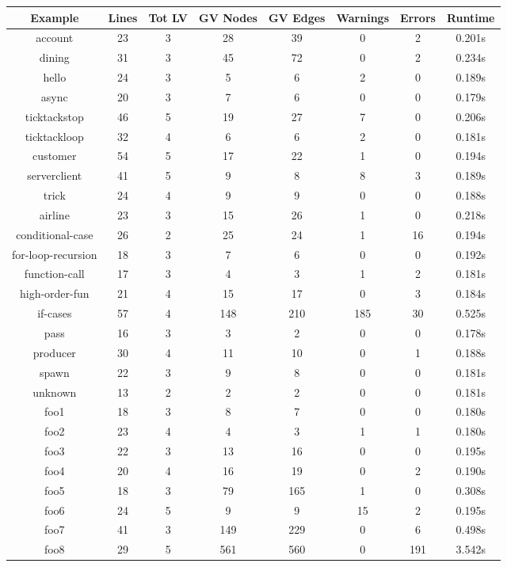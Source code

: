 \begin{table}[!ht]
\centering
\begin{tabular}{|c|c|c|c|c|c|c|c|}
\hline
Example & Lines & Tot LV & GV Nodes & GV Edges & Warnings & Errors & Runtime \\ 
\hline
account & 23 & 3 & 28 & 39 & 0 & 2 & 0.201s \\ 
dining & 31 & 3 & 45 & 72 & 0 & 2 & 0.234s \\ 
hello & 24 & 3 & 5 & 6 & 2 & 0 & 0.189s \\ 
async & 20 & 3 & 7 & 6 & 0 & 0 & 0.179s \\ 
ticktackstop & 46 & 5 & 19 & 27 & 7 & 0 & 0.206s \\ 
ticktackloop & 32 & 4 & 6 & 6 & 2 & 0 & 0.181s \\ 
customer & 54 & 5 & 17 & 22 & 1 & 0 & 0.194s \\ 
serverclient & 41 & 5 & 9 & 8 & 8 & 3 & 0.189s \\ 
trick & 24 & 4 & 9 & 9 & 0 & 0 & 0.188s \\ 
airline & 23 & 3 & 15 & 26 & 1 & 0 & 0.218s \\ 
conditional-case & 26 & 2 & 25 & 24 & 1 & 16 & 0.194s \\ 
for-loop-recursion & 18 & 3 & 7 & 6 & 0 & 0 & 0.192s \\ 
function-call & 17 & 3 & 4 & 3 & 1 & 2 & 0.181s \\ 
high-order-fun & 21 & 4 & 15 & 17 & 0 & 3 & 0.184s \\ 
if-cases & 57 & 4 & 148 & 210 & 185 & 30 & 0.525s \\ 
pass & 16 & 3 & 3 & 2 & 0 & 0 & 0.178s \\ 
producer & 30 & 4 & 11 & 10 & 0 & 1 & 0.188s \\ 
spawn & 22 & 3 & 9 & 8 & 0 & 0 & 0.181s \\ 
unknown & 13 & 2 & 2 & 2 & 0 & 0 & 0.181s \\ 
foo1 & 18 & 3 & 8 & 7 & 0 & 0 & 0.180s \\ 
foo2 & 23 & 4 & 4 & 3 & 1 & 1 & 0.180s \\ 
foo3 & 22 & 3 & 13 & 16 & 0 & 0 & 0.195s \\ 
foo4 & 20 & 4 & 16 & 19 & 0 & 2 & 0.190s \\ 
foo5 & 18 & 3 & 79 & 165 & 1 & 0 & 0.308s \\ 
foo6 & 24 & 5 & 9 & 9 & 15 & 2 & 0.195s \\ 
foo7 & 41 & 3 & 149 & 229 & 0 & 6 & 0.498s \\ 
foo8 & 29 & 5 & 561 & 560 & 0 & 191 & 3.542s \\ 

\end{tabular}
\end{table}
